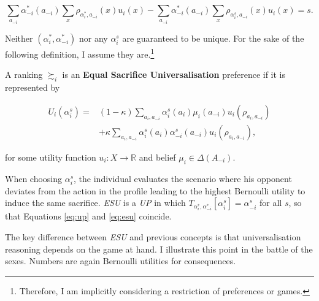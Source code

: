 \begin{equation}\label{eq:sacrifice}
	\sum_{a_{-i}} \alpha^{*}_{-i} ( a_{-i} ) \sum_{x} \rho_{\alpha^{*}_i,a_{-i}} ( x ) u_i ( x ) - \sum_{a_{-i}} \alpha^{*}_{-i} ( a_{-i} ) \sum_{x} \rho_{\alpha^{s}_i,a_{-i}} ( x ) u_i ( x ) = s .
\end{equation}

Neither \((\alpha^{*}_i, \alpha^{*}_{-i} )\) nor any \(\alpha_i^s\) are guaranteed to be unique. For the sake of the following definition, I assume they are.\footnote{Therefore, I am implicitly considering a restriction of preferences or games.}

\begin{definition}\label{def:esu}
	A ranking \( \succsim_i \) is an \textbf{Equal Sacrifice Universalisation} preference if it is represented by

	\begin{equation}\label{eq:esu}
		\begin{aligned}
			U_i ( \alpha^{s}_{i} ) = {} & (1-\kappa )\sum_{a_i, a_{-i}} \alpha^{s}_{i} (a_i) \mu_{i}(a_{-i}) u_i(\rho_{a_i, a_{-i}})         \\[1mm]
			{}                          & + \kappa \sum_{a_i, a_{-i}} \alpha^{s}_{i} (a_i) \alpha^{s}_{-i} (a_{-i}) u_i(\rho_{a_i, a_{-i}}),
		\end{aligned}
	\end{equation}

	for some utility function \(u_i \colon X \rightarrow \mathbb{R}\) and belief \(\mu_i \in \Delta (A_{-i} )\).
\end{definition}

When choosing \(\alpha^{s}_i\), the individual evaluates the scenario where his opponent deviates from the action in the profile leading to the highest Bernoulli utility to induce the same sacrifice. \textit{ESU} is a \textit{UP} in which \( T_{\alpha^{*}_i, \alpha^{*}_{-i}} [ \alpha^s_i ] = \alpha_{-i}^s \) for all \( s \), so that Equations \eqref{eq:up} and \eqref{eq:esu} coincide.

The key difference between \textit{ESU} and previous concepts is that universalisation reasoning depends on the game at hand. I illustrate this point in the battle of the sexes. Numbers are again Bernoulli utilities for consequences.

